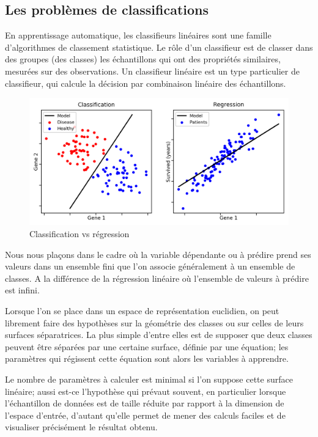 	
	\subsection{Les problèmes de classifications}
		En apprentissage automatique, les classifieurs linéaires sont une famille d'algorithmes de classement statistique. Le rôle d'un classifieur est de classer dans des groupes (des classes) les échantillons qui ont des propriétés similaires, mesurées sur des observations. Un classifieur linéaire est un type particulier de classifieur, qui calcule la décision par combinaison linéaire des échantillons.
		
		\begin{figure}[bth]%
			\centering
			\includegraphics[width=15cm]{images/classification_vs_regression.png}
			\caption{Classification vs régression \cite[image de][]{ml2008python}
			}
			\label{fig:class_vs_reg}
		\end{figure}
		
		Nous nous plaçons dans le cadre où la variable dépendante ou à prédire prend ses valeurs dans un ensemble fini que l'on associe généralement à un ensemble de classes. A la différence de la régression linéaire où l’ensemble de valeurs à prédire est infini.
		
		Lorsque l'on se place dans un espace de représentation euclidien, on peut librement faire des hypothèses sur la géométrie des classes ou sur celles de leurs surfaces séparatrices. La plus simple d'entre elles est de supposer que deux classes peuvent être séparées par une certaine surface, définie par une équation; les paramètres qui régissent cette équation sont alors les variables à apprendre.
		
		Le nombre de paramètres à calculer est minimal si l'on suppose cette surface linéaire; aussi est-ce l'hypothèse qui prévaut souvent, en particulier lorsque l'échantillon de données est de taille réduite par rapport à la dimension de l'espace d'entrée, d'autant qu'elle permet de mener des calculs faciles et de visualiser précisément le résultat obtenu.
		
